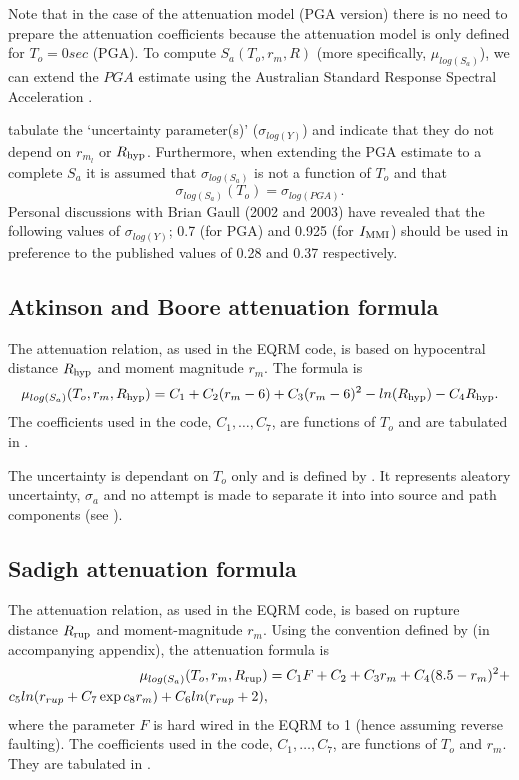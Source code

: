 Note that in the case of the \citet{dr_Gaull90a} attenuation model
(PGA version) there is no need to prepare the attenuation
coefficients because the attenuation model is only defined for
$T_o=0 sec$ (PGA). To compute $S_a(T_o,r_m,R)$ (more specifically,
$\mu_{log(S_a)}$), we can extend the $PGA$ estimate using the
Australian Standard Response Spectral Acceleration
\citep{dr_Standards93a}. 

\citet[Table 4]{dr_Gaull90a} tabulate the `uncertainty
parameter(s)' ($\sigma_{log(Y)}$) and indicate that they do not
depend on $r_{m_l}$ or $\Rhyp$. Furthermore, when extending the
PGA estimate to a complete $S_a$ it is assumed that
$\sigma_{log(S_a)}$ is not a function of $T_o$ and that
\begin{equation}
\sigma_{log(S_a)}(T_o) = \sigma_{log(PGA)}.
\end{equation}
Personal discussions with Brian Gaull (2002 and 2003) have
revealed that the following values of $\sigma_{log(Y)}$; 0.7 (for
PGA) and 0.925 (for $\Imm$) should be used in preference to the
published values of 0.28 and 0.37 respectively.


\subsection{Atkinson and Boore attenuation formula}

The \cite{dr_Atkinson97a} attenuation relation, as used in the
EQRM code, is based on hypocentral distance $\Rhyp$ and moment
magnitude $r_m$. The formula is
\begin{equation}
\mu_{log(S_a)}(T_o,r_m,\Rhyp) = C_1 + C_2(r_m-6) + C_3(r_m-6)^2
-ln(\Rhyp)-C_4\Rhyp.
\end{equation}
The coefficients used in the code, $C_1,\ldots,C_7$, are functions
of $T_o$ and are tabulated in \citet[Table 1]{dr_Atkinson97a}.

The uncertainty is dependant on $T_o$ only and is defined by
\citet{dr_Atkinson95b}. It represents aleatory uncertainty,
$\sigma_a$ and no attempt is made to separate it into into source
and path components (see \citealt[Table 2]{dr_Atkinson79a}).


\subsection{Sadigh attenuation formula}

The \cite{dr_Sadigh97a} attenuation relation, as used in the EQRM
code, is based on rupture distance $\Rrup$ and moment-magnitude
$r_m$. Using the convention defined by \citet{dr_Campbell03a} (in
accompanying appendix), the attenuation formula is
\begin{equation}
\begin{split}
\mu_{log(S_a)}(T_o,r_m,\Rrup) & = C_1F +C_2 + C_3r_m
+C_4(8.5-r_m)^2 + \\ c_5ln(r_{rup}+C_7\exp{c_8r_m}) +
C_6ln(r_{rup}+2),
\end{split}
\end{equation}
where the parameter $F$ is hard wired in the EQRM to 1 (hence
assuming reverse faulting). The coefficients used in the code,
$C_1,\ldots,C_7$, are functions of $T_o$ and $ r_m$. They are
tabulated in \citet[Table 2]{dr_Sadigh97a}.

